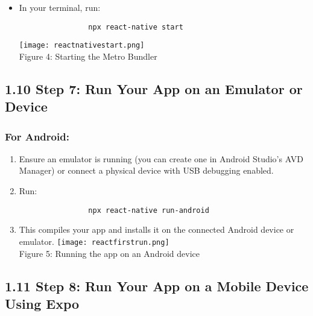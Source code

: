 \documentclass{article}
\begin{document}
        \begin{itemize}
            \item In your terminal, run:
                \begin{verbatim}
                npx react-native start
                \end{verbatim}
                 \centering
                        \texttt{[image: reactnativestart.png]}\\
                        \caption{Figure 4: Starting the Metro Bundler}
           
        \end{itemize}

        \subsection*{1.10 Step 7: Run Your App on an Emulator or Device}

        \subsubsection*{For Android:}

        \begin{enumerate}
            \item Ensure an emulator is running (you can create one in Android Studio's AVD Manager) or connect a physical device with USB debugging enabled.
            \item Run:
                \begin{verbatim}
                npx react-native run-android
                \end{verbatim}
                
            \item This compiles your app and installs it on the connected Android device or emulator.
             \centering
                        \texttt{[image: reactfirstrun.png]}\\
                        \caption{Figure 5: Running the app on an Android device}
        \end{enumerate}

        \subsection*{1.11 Step 8: Run Your App on a Mobile Device Using Expo}
\end{document}
